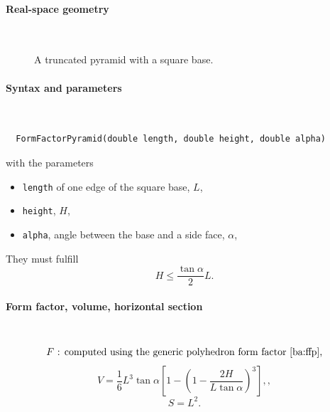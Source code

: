 \paragraph{Real-space geometry}\strut\\

\begin{figure}[H]
\hfill
{}
\hfill
{}
\hfill
{}
\hfill
\caption{A truncated pyramid with a square base.}
\end{figure}

\FloatBarrier

\paragraph{Syntax and parameters}\strut\\[-2ex plus .2ex minus .2ex]
\begin{lstlisting}
  FormFactorPyramid(double length, double height, double alpha)
\end{lstlisting}
with the parameters
\begin{itemize}
\item \texttt{length} of one edge of the square base, $L$,
\item \texttt{height}, $H$,
\item \texttt{alpha}, angle between the base and a side face, $\alpha$,
\end{itemize}
They must fulfill
\begin{displaymath}
  H \le \frac{\tan\alpha}{2}L.
\end{displaymath}

\paragraph{Form factor, volume, horizontal section}\strut\\
\begin{equation*}
  F \text{~: computed using the generic polyhedron form factor~\cite{ba:ffp},}
\end{equation*}
\begin{equation*}
  V = \dfrac{1}{6}  L^3 \tan\alpha\left[ 1
             - \left(1 - \dfrac{2H}{L\tan\alpha}\right)^3 \right],,
\end{equation*}
\begin{equation*}
  S = L^2.
\end{equation*}


